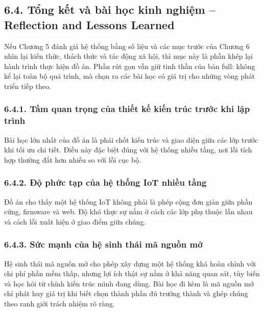 \documentclass[a4paper]{extarticle}
\begin{document}
\subsection{6.4. Tổng kết và bài học kinh nghiệm -- Reflection and Lessons Learned}\label{64-tux1ed5ng-kux1ebft-vuxe0-buxe0i-hux1ecdc-kinh-nghiux1ec7m--reflection-and-lessons-learned}

Nếu Chương 5 đánh giá hệ thống bằng số liệu và các mục trước của Chương 6 nhìn lại kiến thức, thách thức và tác động xã hội, thì mục này là phần khép lại hành trình thực hiện đồ án. Phần rút gọn vẫn giữ tinh thần của bản full: không kể lại toàn bộ quá trình, mà chọn ra các bài học có giá trị cho những vòng phát triển tiếp theo.

\subsubsection{6.4.1. Tầm quan trọng của thiết kế kiến trúc trước khi
lập
trình}\label{641-tux1ea7m-quan-trux1ecdng-cux1ee7a-thiux1ebft-kux1ebf-kiux1ebfn-truxfac-trux1b0ux1edbc-khi-lux1eadp-truxecnh}

Bài học lớn nhất của đồ án là phải chốt kiến trúc và giao diện giữa các lớp trước khi tối ưu chi tiết. Điều này đặc biệt đúng với hệ thống nhiều tầng, nơi lỗi tích hợp thường đắt hơn nhiều so với lỗi cục bộ.

\subsubsection{6.4.2. Độ phức tạp của hệ thống IoT nhiều
tầng}\label{642-ux111ux1ed9-phux1ee9c-tux1ea1p-cux1ee7a-hux1ec7-thux1ed1ng-iot-nhiux1ec1u-tux1ea7ng}

Đồ án cho thấy một hệ thống IoT không phải là phép cộng đơn giản giữa phần cứng, firmware và web. Độ khó thực sự nằm ở cách các lớp phụ thuộc lẫn nhau và cách lỗi xuất hiện ở giao điểm giữa chúng.

\subsubsection{6.4.3. Sức mạnh của hệ sinh thái mã nguồn
mở}\label{643-sux1ee9c-mux1ea1nh-cux1ee7a-hux1ec7-sinh-thuxe1i-muxe3-nguux1ed3n-mux1edf}

Hệ sinh thái mã nguồn mở cho phép xây dựng một hệ thống khá hoàn chỉnh với chi phí phần mềm thấp, nhưng lợi ích thật sự nằm ở khả năng quan sát, tùy biến và học hỏi từ chính kiến trúc mình đang dùng. Bài học đi kèm là mã nguồn mở chỉ phát huy giá trị khi biết chọn thành phần đủ trưởng thành và ghép chúng theo ranh giới trách nhiệm rõ ràng.
\end{document}
